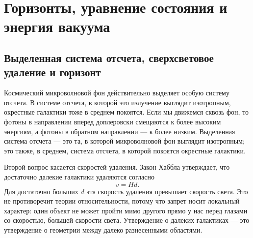 \chapter{Горизонты, уравнение состояния и энергия вакуума}

\section{Выделенная система отсчета, сверхсветовое удаление и горизонт}

Космический микроволновой фон действительно выделяет особую систему отсчета. В системе отсчета, в которой это излучение выглядит изотропным, окрестные галактики тоже в среднем покоятся. Если мы движемся сквозь фон, то фотоны в направлении вперед доплеровски смещаются к более высоким энергиям, а фотоны в обратном направлении — к более низким. Выделенная система отсчета — это та, в которой микроволновой фон выглядит изотропным; это также, в среднем, система отсчета, в которой покоятся окрестные галактики.

\begin{classroomqa}
\end{classroomqa}

Второй вопрос касается скоростей удаления. Закон Хаббла утверждает, что достаточно далекие галактики удаляются согласно
\begin{equation}
v = H d .
\end{equation}
Для достаточно больших \(d\) эта скорость удаления превышает скорость света. Это не противоречит теории относительности, потому что запрет носит локальный характер: один объект не может пройти мимо другого прямо у нас перед глазами со скоростью, большей скорости света. Утверждение о далеких галактиках — это утверждение о геометрии между далеко разнесенными областями.

\begin{classroomqa}
\end{classroomqa}

